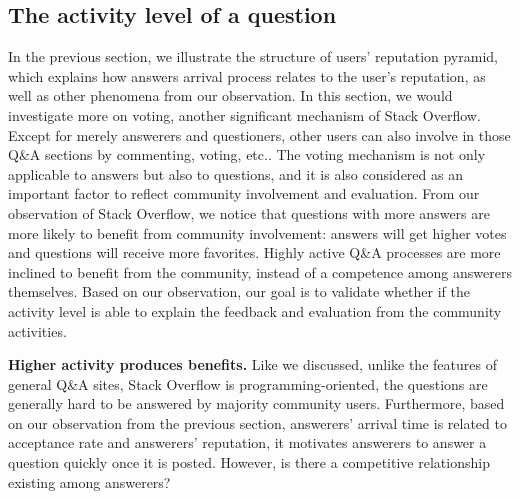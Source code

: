 \subsection{The activity level of a question}
In the previous section, we illustrate the structure of users' reputation pyramid, which explains how answers arrival process relates to the user's reputation, as well as other phenomena from our observation. In this section, we would investigate more on voting, another significant mechanism of Stack Overflow. Except for merely answerers and questioners, other users can also involve in those Q\&A sections by commenting, voting, etc.. The voting mechanism is not only applicable to answers but also to questions, and it is also considered as an important factor to reflect community involvement and evaluation. From our observation of Stack Overflow, we notice that questions with more answers are more likely to benefit from community involvement: answers will get higher votes and questions will receive more favorites. Highly active Q\&A processes are more inclined to benefit from the community, instead of a competence among answerers themselves.  Based on our observation, our goal is to validate whether if the activity level is able to explain the feedback and evaluation from the community activities.

\textbf{Higher activity produces benefits.}
Like we discussed, unlike the features of general Q\&A sites, Stack Overflow is programming-oriented, the questions are generally hard to be answered by majority community users. Furthermore, based on our observation from the previous section, answerers' arrival time is related to acceptance rate and answerers' reputation, it motivates answerers to answer a question quickly once it is posted. However, is there a competitive relationship existing among answerers?

